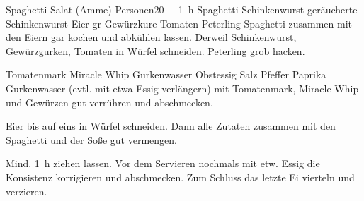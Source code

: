 \begin{MyRecipe}{Spaghetti Salat (Amme)}{ Personen}{\SI{20}{\minuteprime} + \SI{1}{\hour}}
	 {Spaghetti}
	\ingredient[\Calc{0.1}{\x}]{\si{\kilogram}} {Schinkenwurst}
	\ingredient[\Calc{0.1}{\x}]{\si{\kilogram}} {geräucherte Schinkenwurst}
	\ingredient[\Calc{5}{\x}]{} {Eier}
	\ingredient[\Calc{2}{\x}]{} {gr Gewürzkure}
	\ingredient[\Calc{4}{\x}]{} {Tomaten}
	 {Peterling}
	Spaghetti zusammen mit den Eiern gar kochen und abkühlen lassen. Derweil Schinkenwurst, Gewürzgurken, Tomaten in Würfel schneiden. Peterling grob hacken.\par\bigskip

	\ingredient[]{} {Tomatenmark}
	 {Miracle Whip}
	\ingredient[]{} {Gurkenwasser}
	\ingredient[etw.]{} {Obstessig}
	\ingredient[]{} {Salz}
	\ingredient[]{} {Pfeffer}
	\ingredient[]{} {Paprika}
	Gurkenwasser (evtl. mit etwa Essig verlängern) mit Tomatenmark, Miracle Whip und Gewürzen gut verrühren und abschmecken.\par\bigskip

	Eier bis auf eins in Würfel schneiden. Dann alle Zutaten zusammen mit den Spaghetti und der Soße gut vermengen.\par\bigskip
	
	Mind. \SI{1}{\hour} ziehen lassen. Vor dem Servieren nochmals mit etw. Essig die Konsistenz korrigieren und abschmecken. Zum Schluss das letzte Ei vierteln und verzieren.
	
	
	
	
\end{MyRecipe}